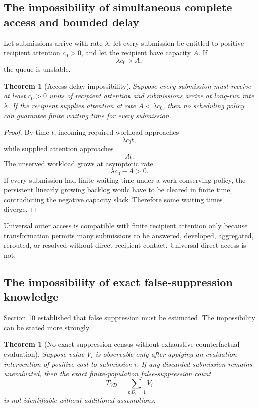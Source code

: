 \documentclass[11pt]{article}
\newtheorem{theorem}[definition]{Theorem}
\theoremstyle{definition}
\begin{document}
\subsection{The impossibility of simultaneous complete access and bounded delay}

Let submissions arrive with rate \(\lambda\), let every submission be entitled to positive recipient attention \(c_0>0\), and let the recipient have capacity \(A\). If
\[
\lambda c_0>A,
\]
the queue is unstable.

\begin{theorem}[Access-delay impossibility]
Suppose every submission must receive at least \(c_0>0\) units of recipient attention and submissions arrive at long-run rate \(\lambda\). If the recipient supplies attention at rate \(A<\lambda c_0\), then no scheduling policy can guarantee finite waiting time for every submission.
\end{theorem}

\begin{proof}
By time \(t\), incoming required workload approaches
\[
\lambda c_0t,
\]
while supplied attention approaches
\[
At.
\]
The unserved workload grows at asymptotic rate
\[
\lambda c_0-A>0.
\]
If every submission had finite waiting time under a work-conserving policy, the persistent linearly growing backlog would have to be cleared in finite time, contradicting the negative capacity slack. Therefore some waiting times diverge.
\end{proof}

Universal outer access is compatible with finite recipient attention only because transformation permits many submissions to be answered, developed, aggregated, rerouted, or resolved without direct recipient contact. Universal direct access is not.

\subsection{The impossibility of exact false-suppression knowledge}

Section 10 established that false suppression must be estimated. The impossibility can be stated more strongly.

\begin{theorem}[No exact suppression census without exhaustive counterfactual evaluation]
Suppose value \(V_i\) is observable only after applying an evaluation intervention of positive cost to submission \(i\). If any discarded submission remains unevaluated, then the exact finite-population false-suppression count
\[
T_{VD}
=
\sum_{i:D_i=1}V_i
\]
is not identifiable without additional assumptions.
\end{theorem}
\end{document}
